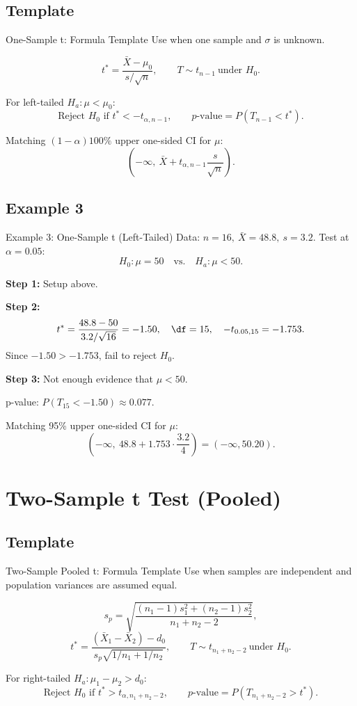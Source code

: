 \documentclass[aspectratio=169]{beamer}
\begin{document}
\subsection{Template}
\begin{frame}{One-Sample t: Formula Template}
  Use when one sample and \(\sigma\) is unknown.

  \[
    t^*=\frac{\bar X-\mu_0}{s/\sqrt{n}},
    \qquad
    T\sim t_{n-1}\ \text{under }H_0.
  \]

  For left-tailed \(H_a:\mu<\mu_0\):
  \[
    \text{Reject }H_0\text{ if }t^*<-t_{\alpha,n-1},
    \qquad
    p\text{-value}=P(T_{n-1}<t^*).
  \]

  Matching \((1-\alpha)100\%\) upper one-sided CI for \(\mu\):
  \[
    \left(-\infty,\ \bar X+t_{\alpha,n-1}\frac{s}{\sqrt{n}}\right).
  \]
\end{frame}

\subsection{Example 3}
\begin{frame}{Example 3: One-Sample t (Left-Tailed)}
  Data: \(n=16,\ \bar X=48.8,\ s=3.2\). Test at \(\alpha=0.05\):
  \[
    H_0:\mu=50
    \quad\text{vs.}\quad
    H_a:\mu<50.
  \]

  \textbf{Step 1:} Setup above.

  \textbf{Step 2:}
  \[
    t^*=\frac{48.8-50}{3.2/\sqrt{16}}=-1.50,
    \quad
    \df=15,
    \quad
    -t_{0.05,15}=-1.753.
  \]
  Since \(-1.50>-1.753\), fail to reject \(H_0\).

  \textbf{Step 3:} Not enough evidence that \(\mu<50\).

  \vspace{1mm}
  p-value: \(P(T_{15}<-1.50)\approx0.077\).

  Matching 95\% upper one-sided CI for \(\mu\):
  \[
    \left(-\infty,\ 48.8+1.753\cdot\frac{3.2}{4}\right)=(-\infty,50.20).
  \]
\end{frame}

\section{Two-Sample t Test (Pooled)}

\subsection{Template}
\begin{frame}{Two-Sample Pooled t: Formula Template}
  Use when samples are independent and population variances are assumed equal.

  \[
    s_p=\sqrt{\frac{(n_1-1)s_1^2+(n_2-1)s_2^2}{n_1+n_2-2}},
  \]
  \[
    t^*=\frac{(\bar X_1-\bar X_2)-d_0}{s_p\sqrt{1/n_1+1/n_2}},
    \qquad
    T\sim t_{n_1+n_2-2}\ \text{under }H_0.
  \]

  For right-tailed \(H_a:\mu_1-\mu_2>d_0\):
  \[
    \text{Reject }H_0\text{ if }t^*>t_{\alpha,n_1+n_2-2},
    \qquad
    p\text{-value}=P(T_{n_1+n_2-2}>t^*).
  \]
\end{frame}
\end{document}
